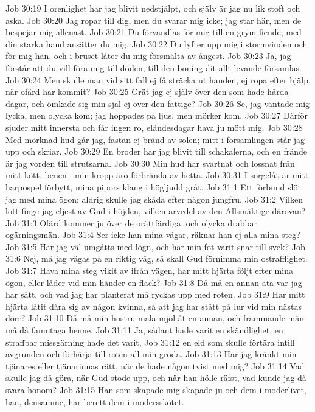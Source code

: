 Job 30:19  I orenlighet har jag blivit nedstjälpt, och själv är jag nu lik stoft och aska.
Job 30:20  Jag ropar till dig, men du svarar mig icke; jag står här, men de bespejar mig allenast.
Job 30:21  Du förvandlas för mig till en grym fiende, med din starka hand ansätter du mig.
Job 30:22  Du lyfter upp mig i stormvinden och för mig hän, och i bruset låter du mig försmälta av ångest.
Job 30:23  Ja, jag förstår att du vill föra mig till döden, till den boning dit allt levande församlas.
Job 30:24  Men skulle man vid sitt fall ej få sträcka ut handen, ej ropa efter hjälp, när ofärd har kommit?
Job 30:25  Grät jag ej själv över den som hade hårda dagar, och ömkade sig min själ ej över den fattige?
Job 30:26  Se, jag väntade mig lycka, men olycka kom; jag hoppades på ljus, men mörker kom.
Job 30:27  Därför sjuder mitt innersta och får ingen ro, eländesdagar hava ju mött mig.
Job 30:28  Med mörknad hud går jag, fastän ej bränd av solen; mitt i församlingen står jag upp och skriar.
Job 30:29  En broder har jag blivit till schakalerna, och en frände är jag vorden till strutsarna.
Job 30:30  Min hud har svartnat och lossnat från mitt kött, benen i min kropp äro förbrända av hetta.
Job 30:31  I sorgelåt är mitt harpospel förbytt, mina pipors klang i högljudd gråt.
Job 31:1  Ett förbund slöt jag med mina ögon: aldrig skulle jag skåda efter någon jungfru.
Job 31:2  Vilken lott finge jag eljest av Gud i höjden, vilken arvedel av den Allsmäktige därovan?
Job 31:3  Ofärd kommer ju över de orättfärdiga, och olycka drabbar ogärningsmän.
Job 31:4  Ser icke han mina vägar, räknar han ej alla mina steg?
Job 31:5  Har jag väl umgåtts med lögn, och har min fot varit snar till svek?
Job 31:6  Nej, må jag vägas på en riktig våg, så skall Gud förnimma min ostrafflighet.
Job 31:7  Hava mina steg vikit av ifrån vägen, har mitt hjärta följt efter mina ögon, eller låder vid min händer en fläck?
Job 31:8  Då må en annan äta var jag har sått, och vad jag har planterat må ryckas upp med roten.
Job 31:9  Har mitt hjärta låtit dåra sig av någon kvinna, så att jag har stått på lur vid min nästas dörr?
Job 31:10  Då må min hustru mala mjöl åt en annan, och främmande män må då famntaga henne.
Job 31:11  Ja, sådant hade varit en skändlighet, en straffbar missgärning hade det varit,
Job 31:12  en eld som skulle förtära intill avgrunden och förhärja till roten all min gröda.
Job 31:13  Har jag kränkt min tjänares eller tjänarinnas rätt, när de hade någon tvist med mig?
Job 31:14  Vad skulle jag då göra, när Gud stode upp, och när han hölle räfst, vad kunde jag då svara honom?
Job 31:15  Han som skapade mig skapade ju och dem i moderlivet, han, densamme, har berett dem i modersskötet.
